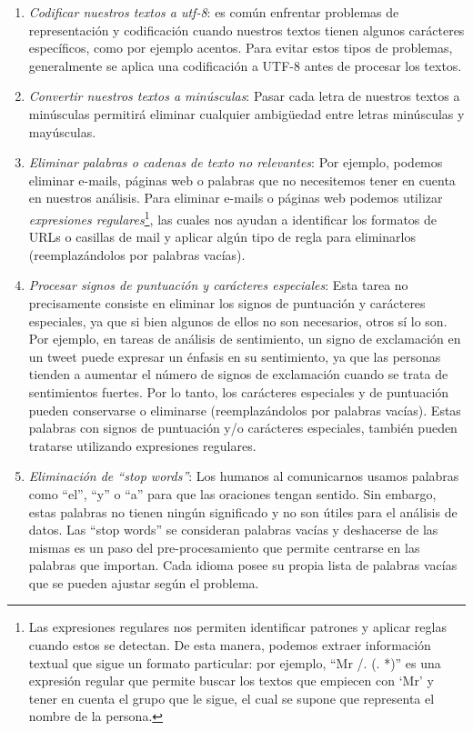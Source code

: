 \documentclass[12pt,a4paper]{article}
\begin{document}
\begin{sloppypar}
\begin{enumerate}
\item \textit{Codificar nuestros textos a utf-8}: es común enfrentar problemas de representación y codificación cuando nuestros textos tienen algunos carácteres específicos, como por ejemplo acentos. Para evitar estos tipos de problemas, generalmente se aplica una codificación a UTF-8 antes de procesar los textos.
\item \textit{Convertir nuestros textos a minúsculas}: Pasar cada letra de nuestros textos a minúsculas permitirá eliminar cualquier ambigüedad entre letras minúsculas y mayúsculas. 
\item \textit{Eliminar palabras o cadenas de texto no relevantes}: Por ejemplo, podemos eliminar e-mails, páginas web o palabras que no necesitemos tener en cuenta en nuestros análisis. Para eliminar e-mails o páginas web podemos utilizar \textit{expresiones regulares}\footnote{Las expresiones regulares nos permiten identificar patrones y aplicar reglas cuando estos se detectan. De esta manera, podemos extraer información textual que sigue un formato particular: por ejemplo, “Mr /. (. *)” es una expresión regular que permite buscar los textos que empiecen con ‘Mr’ y tener en cuenta el grupo que le sigue, el cual se supone que representa el nombre de la persona\cite{NLP_2}.}, las cuales nos ayudan a identificar los formatos de URLs o casillas de mail y aplicar algún tipo de regla para eliminarlos (reemplazándolos por palabras vacías). 
\item \textit{Procesar signos de puntuación y carácteres especiales}: Esta tarea no precisamente consiste en eliminar los signos de puntuación y carácteres especiales, ya que si bien algunos de ellos no son necesarios, otros sí lo son. Por ejemplo, en tareas de análisis de sentimiento, un signo de exclamación en un tweet puede expresar un énfasis en su sentimiento, ya que las personas tienden a aumentar el número de signos de exclamación cuando se trata de sentimientos fuertes. Por lo tanto, los carácteres especiales y de puntuación pueden conservarse o eliminarse (reemplazándolos por palabras vacías). Estas palabras con signos de puntuación y/o carácteres especiales, también pueden tratarse utilizando expresiones regulares.
\item \textit{Eliminación de “stop words”}: Los humanos al comunicarnos usamos palabras como “el”, “y” o “a” para que las oraciones tengan sentido. Sin embargo, estas palabras no tienen ningún significado y no son útiles para el análisis de datos. Las “stop words” se consideran palabras vacías y deshacerse de las mismas es un paso del pre-procesamiento que permite centrarse en las palabras que importan. Cada idioma posee su propia lista de palabras vacías que se pueden ajustar según el problema. 


\end{enumerate}
\end{sloppypar}
\end{document}
